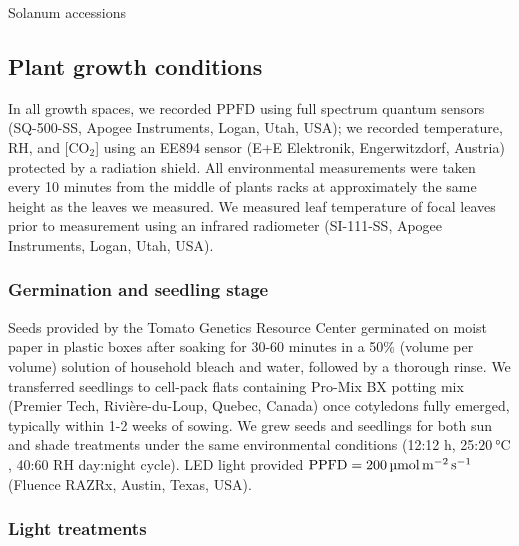 \documentclass[
  letterpaper,
  DIV=11,
  numbers=noendperiod]{scrartcl}
\begin{document}
\begin{table}

\caption{\label{tbl-accessions}Solanum accessions}

\centering{

}

\end{table}%

\subsection{Plant growth conditions}\label{plant-growth-conditions}

In all growth spaces, we recorded \(\mathrm{PPFD}\) using full spectrum
quantum sensors (SQ-500-SS, Apogee Instruments, Logan, Utah, USA); we
recorded temperature, RH, and {[}CO\(_2\){]} using an EE894 sensor (E+E
Elektronik, Engerwitzdorf, Austria) protected by a radiation shield. All
environmental measurements were taken every 10 minutes from the middle
of plants racks at approximately the same height as the leaves we
measured. We measured leaf temperature of focal leaves prior to
measurement using an infrared radiometer (SI-111-SS, Apogee Instruments,
Logan, Utah, USA).

\subsubsection{Germination and seedling
stage}\label{germination-and-seedling-stage}

Seeds provided by the Tomato Genetics Resource Center germinated on
moist paper in plastic boxes after soaking for 30-60 minutes in a 50\%
(volume per volume) solution of household bleach and water, followed by
a thorough rinse. We transferred seedlings to cell-pack flats containing
Pro-Mix BX potting mix (Premier Tech, Rivière-du-Loup, Quebec, Canada)
once cotyledons fully emerged, typically within 1-2 weeks of sowing. We
grew seeds and seedlings for both sun and shade treatments under the
same environmental conditions (12:12 h, 25:\(\qty{20}{\degreeCelsius}\),
40:60 RH day:night cycle). LED light provided
\(\mathrm{PPFD} = \qty{200}{\micro\mol\raiseto{-2}\meter\raiseto{-1}\second}\)
(Fluence RAZRx, Austin, Texas, USA).

\subsubsection{Light treatments}\label{light-treatments}
\end{document}
